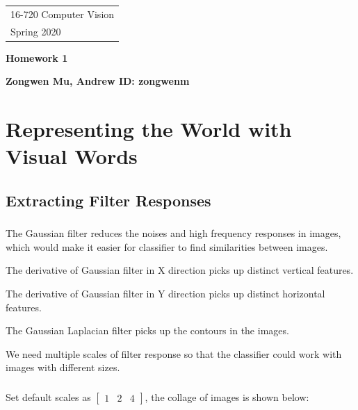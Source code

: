\documentclass[11pt]{article} \usepackage{fullpage} \usepackage{graphicx} \usepackage{epstopdf} \usepackage{color} \usepackage{psfrag} \usepackage{pdfsync}\usepackage{indentfirst}\usepackage{subfigure}\usepackage{float}\usepackage[section]{placeins}
\begin{document}
{\parindent 0pt \begin{tabular}[t]{l} 16-720 Computer Vision \\ Spring 2020 \end{tabular}}%
\parindent 0pt \parskip 8pt
\begin{center} \large\bf Homework 1 \end{center}
\begin{center} \large\bf Zongwen Mu, Andrew ID: zongwenm \end{center}
\bigskip


\section{Representing the World with Visual Words}

\setcounter{subsection}{0}
\subsection{Extracting Filter Responses}

\setcounter{subsubsection}{0}
\subsubsection{}

\setlength{\parindent}{2em} The Gaussian filter reduces the noises and high frequency responses in images, which would make it easier for classifier to find similarities between images.

The derivative of Gaussian filter in X direction picks up distinct vertical features.

The derivative of Gaussian filter in Y direction picks up distinct horizontal features.

The Gaussian Laplacian filter picks up the contours in the images.

We need multiple scales of filter response so that the classifier could work with images with different sizes.

\setcounter{subsubsection}{1}
\subsubsection{}

Set default scales as $\left[ \begin{smallmatrix} 1 & 2 & 4 \end{smallmatrix} \right]$, the collage of images is shown below:
\end{document}
